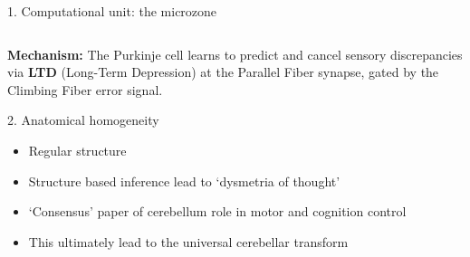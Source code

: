 \documentclass[10pt]{beamer}
\begin{document}
\begin{frame}{1. Computational unit: the microzone}
\begin{columns}
		\end{columns}
		
		\vspace{0.5cm}
		\textbf{Mechanism:} The Purkinje cell learns to predict and cancel sensory discrepancies via \textbf{LTD} (Long-Term Depression) at the Parallel Fiber synapse, gated by the Climbing Fiber error signal.
	\end{frame}
	
	\begin{frame}{2. Anatomical homogeneity}
		\begin{itemize}
			\item Regular structure \parencite{ecclesCerebellumNeuronalMachine1967}
			\item Structure based inference lead to `dysmetria of thought' \parencite{schmahmannDysmetriaThoughtClinical1998}
			\item `Consensus' paper of cerebellum role in motor and cognition control \parencite{koziolConsensusPaperCerebellums2014}
			\item This ultimately lead to the universal cerebellar transform \parencite{itoCerebellarCircuitryNeuronal2006,schmahmannMovementThoughtAnatomic1996}
		\end{itemize}
	\end{frame}
	
\end{document}
